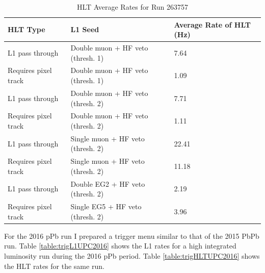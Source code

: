 \begin{table}[h!]
\centering
\caption{HLT Average Rates for Run 263757}
\label{table:trigHLTUPC2015}
\begin{tabular}{@{}lll@{}}
\toprule
HLT Type             & L1 Seed                           & Average Rate of HLT (Hz) \\ \midrule
L1 pass through      & Double muon + HF veto (thresh. 1) & 7.64                     \\
Requires pixel track & Double muon + HF veto (thresh. 1) & 1.09                     \\
L1 pass through      & Double muon + HF veto (thresh. 2) & 7.71                     \\
Requires pixel track & Double muon + HF veto (thresh. 2) & 1.11                     \\
L1 pass through      & Single muon + HF veto (thresh. 2) & 22.41                    \\
Requires pixel track & Single muon + HF veto (thresh. 2) & 11.18                    \\
L1 pass through      & Double EG2 + HF veto (thresh. 2)  & 2.19                     \\
Requires pixel track & Single EG5 + HF veto (thresh. 2)  & 3.96                     \\ \bottomrule
\end{tabular}
\end{table}

For the 2016 pPb run I prepared a trigger menu similar to that of the 2015 PbPb run. Table \ref{table:trigL1UPC2016} shows the L1 rates for a high integrated luminosity run during the 2016 pPb period. Table \ref{table:trigHLTUPC2016} shows the HLT rates for the same run. 

